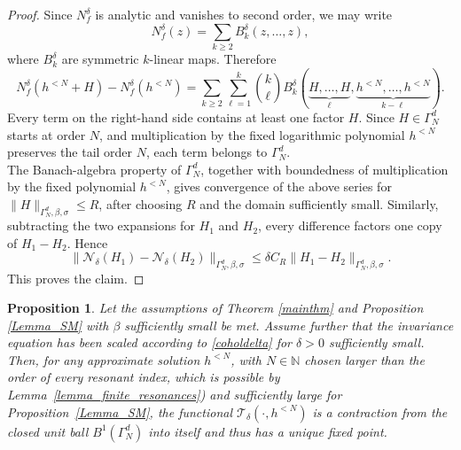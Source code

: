 \documentclass{amsart}
\theoremstyle{plain}
\newtheorem{proposition}[theorem]{Proposition}
\theoremstyle{definition}
\begin{document}
\begin{proof}
Since $N_f^\delta$ is analytic and vanishes to second order, we may write
\begin{equation}
        N_f^\delta(z)
        =
        \sum_{k\ge2} B_k^\delta(z,\ldots,z),
\end{equation}
where $B_k^\delta$ are symmetric $k$-linear maps. Therefore
\begin{equation}
        N_f^\delta(h^{<N}+H)-N_f^\delta(h^{<N})
        =
        \sum_{k\ge2}
        \sum_{\ell=1}^k
        \binom{k}{\ell}
        B_k^\delta(
        \underbrace{H,\ldots,H}_{\ell},
        \underbrace{h^{<N},\ldots,h^{<N}}_{k-\ell}).
\end{equation}
Every term on the right-hand side contains at least one factor $H$. Since
$H\in\Gamma_N^d$ starts at order $N$, and multiplication by the fixed logarithmic
polynomial $h^{<N}$ preserves the tail order $N$, each term belongs to $\Gamma_N^d$.\\
The Banach-algebra property of $\Gamma_N^d$, together with boundedness of multiplication by
the fixed polynomial $h^{<N}$, gives convergence of the above series for
$\|H\|_{\Gamma_N^d,\beta,\sigma}\leq R$, after choosing $R$ and the domain sufficiently small.
Similarly, subtracting the two expansions for $H_1$ and $H_2$, every difference factors
one copy of $H_1-H_2$. Hence
\begin{equation}
        \|\mathcal N_\delta(H_1)-\mathcal N_\delta(H_2)\|_{\Gamma_N^d,\beta,\sigma}
        \le
        \delta C_R
        \|H_1-H_2\|_{\Gamma_N^d,\beta,\sigma}.
\end{equation}
This proves the claim.
\end{proof}








\begin{proposition}\label{propfixedpoint}
Let the assumptions of Theorem \ref{mainthm} and Proposition \ref{Lemma_SM} with
$\beta$ sufficiently small be met. Assume further that the invariance equation has been
scaled according to \eqref{coholdelta} for $\delta>0$ sufficiently small. Then, for any
approximate solution $h^{<N}$, with $N\in\mathbb N$ chosen larger than the order of every resonant index, which is possible by Lemma~\ref{lemma_finite_resonances}) and sufficiently large for Proposition~\ref{Lemma_SM}, the functional $\mathcal T_\delta(\cdot,h^{<N})$ is a contraction from the
closed unit ball $B^1(\Gamma_N^d)$ into itself and thus has a unique fixed point.
\end{proposition}
\end{document}
